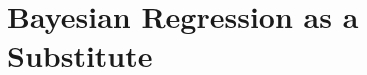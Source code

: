 \begin{comment}
\begin{itemize}
    \item $n_i$: Målte events (kollisjoner) som oppfyller et sett (kalt signalregion) med kriterier (``cuts'').
    \item $b_i$: Bakgrunnen. Estimert SM bidrag for samme signal region.
    \item $s_i$: BSM estimert bidrag for signalregionen med et sett med parameterverdier for en ny BSM modell (i.e SUSY). Den er regnet ut ved 
    \begin{equation}
        s_i = \sigma \epsilon_i A_i \mathcal{L},
    \end{equation}
    der $\sigma$ er tverrsnittet som måler sannsynligheten for at en ``ny'' prosess skjer, $\epsilon_i$ er detektor effektivitet, $A_i$ er akseptans 
    og $\mathcal{L}$ er integrert luminositet over data brukt i søket. 
    \item Statistisk analyse gjøres med å regne ut Poisson likelihood 
    \begin{equation}
        \mathcal{L}(s, b, n) = \frac{e^{-(s + b)}(s + b)^n}{n!}.
    \end{equation} 
    og en test statistikk
    \begin{equation}
        q = -2\ln \frac{\mathcal{L}(s, b, n)}{\mathcal{L}(s=0, b, n)}.
    \end{equation}
\end{itemize}
\end{comment}

\section{Bayesian Regression as a Substitute}





